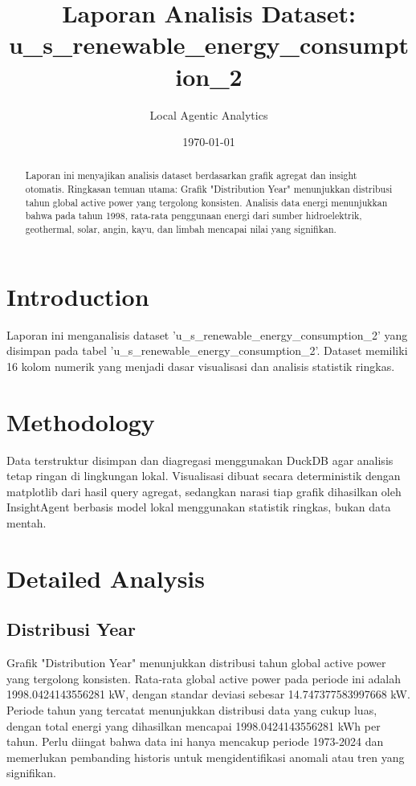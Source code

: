 \documentclass[11pt,a4paper]{article}
\title{ Laporan Analisis Dataset: u\_s\_renewable\_energy\_consumption\_2 }
\author{ Local Agentic Analytics }
\date{\today}
\begin{document}
\maketitle

\begin{abstract}
Laporan ini menyajikan analisis dataset berdasarkan grafik agregat dan insight otomatis. Ringkasan temuan utama: Grafik "Distribution Year" menunjukkan distribusi tahun global active power yang tergolong konsisten. Analisis data energi menunjukkan bahwa pada tahun 1998, rata-rata penggunaan energi dari sumber hidroelektrik, geothermal, solar, angin, kayu, dan limbah mencapai nilai yang signifikan.
\end{abstract}

\section{Introduction}
Laporan ini menganalisis dataset 'u\_s\_renewable\_energy\_consumption\_2' yang disimpan pada tabel 'u\_s\_renewable\_energy\_consumption\_2'. Dataset memiliki 16 kolom numerik yang menjadi dasar visualisasi dan analisis statistik ringkas.

\section{Methodology}
Data terstruktur disimpan dan diagregasi menggunakan DuckDB agar analisis tetap ringan di lingkungan lokal. Visualisasi dibuat secara deterministik dengan matplotlib dari hasil query agregat, sedangkan narasi tiap grafik dihasilkan oleh InsightAgent berbasis model lokal menggunakan statistik ringkas, bukan data mentah.

\section{Detailed Analysis}
\subsection{ Distribusi Year }
Grafik "Distribution Year" menunjukkan distribusi tahun global active power yang tergolong konsisten. Rata-rata global active power pada periode ini adalah 1998.0424143556281 kW, dengan standar deviasi sebesar 14.747377583997668 kW.  Periode tahun yang tercatat menunjukkan distribusi data yang cukup luas, dengan total energi yang dihasilkan mencapai 1998.0424143556281 kWh per tahun. Perlu diingat bahwa data ini hanya mencakup periode 1973-2024 dan memerlukan pembanding historis untuk mengidentifikasi anomali atau tren yang signifikan.
\end{document}
